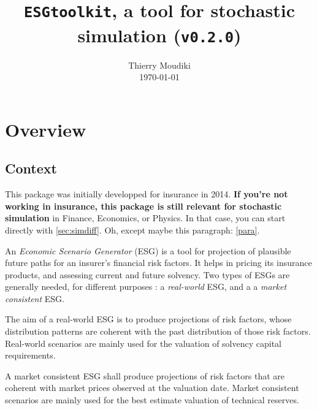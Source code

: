 \documentclass[a4paper]{article}\usepackage[]{graphicx}\usepackage[]{color}
\date{}
\newcommand{\code}[1]{\mbox{\texttt{#1}}}
\begin{document}
\title{\bf{\code{ESGtoolkit}, a tool for stochastic simulation (\code{v0.2.0})}} %
\author{
Thierry Moudiki\\ %
\today{}
}
\maketitle

\tableofcontents

\newpage

\section{Overview}

\subsection{Context}

This package was initially developped for insurance in 2014. \textbf{If you're not working in insurance, this package is still relevant for stochastic simulation} in Finance, Economics, or Physics. In that case, you can start directly with \ref{sec:simdiff}. Oh, except maybe this paragraph: \ref{para}. 

\medskip

An \textit{Economic Scenario Generator} (ESG) is a tool for projection of plausible future paths for an insurer's financial risk factors. It helps in pricing its insurance products, and assessing current and future solvency. Two types of ESGs are generally needed, for different purposes : a \textit{real-world} ESG, and a  a \textit{market consistent} ESG.


\medskip

The aim of a real-world ESG is to produce projections of risk factors, whose distribution patterns are  coherent with the past distribution of those risk factors. Real-world scenarios are mainly used for the valuation of solvency capital requirements.  

\medskip

A market consistent ESG shall produce projections of risk factors that are coherent with market prices observed at the valuation date. Market consistent scenarios are mainly used for the best estimate valuation of technical reserves. 
\end{document}
